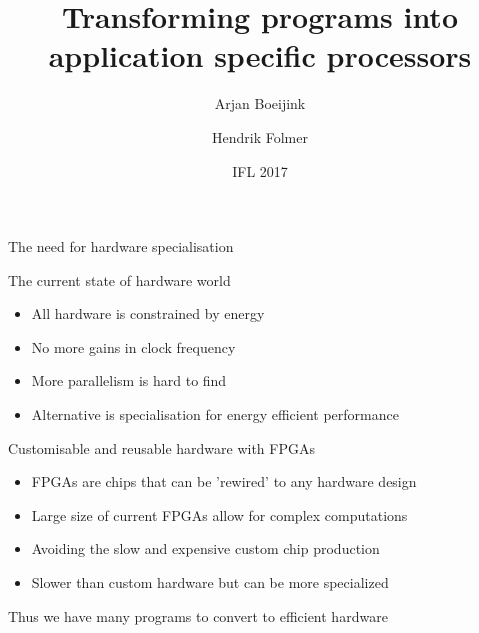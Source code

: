 \documentclass[pdf]{beamer}
\begin{document}
\title{Transforming programs into \\ application specific processors}
\author{Arjan Boeijink \and Hendrik Folmer}
\date{IFL 2017}

\frame{\titlepage}


\begin{frame}{The need for hardware specialisation}

\begin{block}{The current state of hardware world}
\begin{itemize}
\item All hardware is constrained by energy %
\item No more gains in clock frequency %
\item More parallelism is hard to find %
\item Alternative is specialisation for energy efficient performance
\end{itemize}
\end{block}

\begin{block}{Customisable and reusable hardware with FPGAs}
\begin{itemize}
\item FPGAs are chips that can be 'rewired' to any hardware design
\item Large size of current FPGAs allow for complex computations
\item Avoiding the slow and expensive custom chip production
\item Slower than custom hardware but can be more specialized
\end{itemize}
\end{block}

\alert{Thus we have many programs to convert to efficient hardware}
\end{frame}
\end{document}
